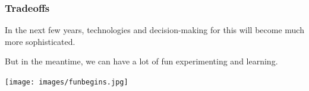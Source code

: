\begin{frame}
\frametitle{Tradeoffs}

In the next few years, technologies and decision-making for this will become much more sophisticated.

But in the meantime, we can have a lot of fun experimenting and learning.
\begin{center}
	\texttt{[image: images/funbegins.jpg]}
\end{center}
\end{frame}




